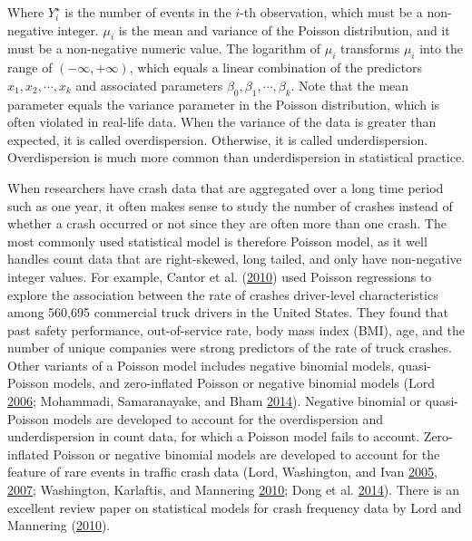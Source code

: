 \documentclass[12pt]{book}
\numberwithin{equation}{chapter}
\begin{document}
Where \(Y_i^\star\) is the number of events in the \(i\)-th observation, which must be a non-negative integer. \(\mu_i\) is the mean and variance of the Poisson distribution, and it must be a non-negative numeric value. The logarithm of \(\mu_i\) transforms \(\mu_i\) into the range of \((-\infty, +\infty)\), which equals a linear combination of the predictors \(x_1, x_2, \cdots, x_k\) and associated parameters \(\beta_0, \beta_1, \cdots, \beta_k\). Note that the mean parameter equals the variance parameter in the Poisson distribution, which is often violated in real-life data. When the variance of the data is greater than expected, it is called overdispersion. Otherwise, it is called underdispersion. Overdispersion is much more common than underdispersion in statistical practice.

When researchers have crash data that are aggregated over a long time period such as one year, it often makes sense to study the number of crashes instead of whether a crash occurred or not since they are often more than one crash. The most commonly used statistical model is therefore Poisson model, as it well handles count data that are right-skewed, long tailed, and only have non-negative integer values. For example, Cantor et al. (\protect\hyperlink{ref-cantor2010driver}{2010}) used Poisson regressions to explore the association between the rate of crashes driver-level characteristics among 560,695 commercial truck drivers in the United States. They found that past safety performance, out-of-service rate, body mass index (BMI), age, and the number of unique companies were strong predictors of the rate of truck crashes.
Other variants of a Poisson model includes negative binomial models, quasi-Poisson models, and zero-inflated Poisson or negative binomial models (Lord \protect\hyperlink{ref-lord2006modeling}{2006}; Mohammadi, Samaranayake, and Bham \protect\hyperlink{ref-mohammadi2014crash}{2014}). Negative binomial or quasi-Poisson models are developed to account for the overdispersion and underdispersion in count data, for which a Poisson model fails to account. Zero-inflated Poisson or negative binomial models are developed to account for the feature of rare events in traffic crash data (Lord, Washington, and Ivan \protect\hyperlink{ref-lord2005poisson}{2005}, \protect\hyperlink{ref-lord2007further}{2007}; Washington, Karlaftis, and Mannering \protect\hyperlink{ref-washington2010statistical}{2010}; Dong et al. \protect\hyperlink{ref-dong2014multivariate}{2014}). There is an excellent review paper on statistical models for crash frequency data by Lord and Mannering (\protect\hyperlink{ref-lord2010statistical}{2010}).
\end{document}
